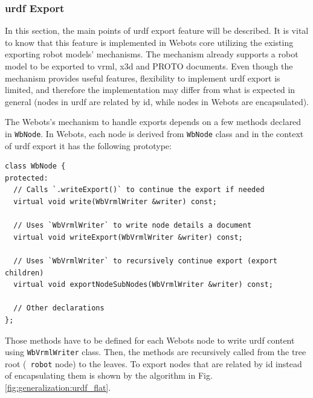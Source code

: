 \subsubsection{\ac{urdf} Export}
\label{subsub:generalization:urdf_export}

In this section, the main points of \ac{urdf} export feature will be described. It is vital to know that this feature is implemented in Webots core utilizing the existing exporting robot models' mechanisms. The mechanism already supports a robot model to be exported to \acs{vrml}, \acs{x3d} and PROTO documents. Even though the mechanism provides useful features, flexibility to implement \ac{urdf} export is limited, and therefore the implementation may differ from what is expected in general (nodes in \ac{urdf} are related by \acs{id}, while nodes in Webots are encapsulated).

The Webots's mechanism to handle exports depends on a few methods declared in \texttt{WbNode}. In Webots, each node is derived from \texttt{WbNode} class and in the context of \ac{urdf} export it has the following prototype:
\begin{verbatim}
class WbNode {
protected:
  // Calls `.writeExport()` to continue the export if needed
  virtual void write(WbVrmlWriter &writer) const;

  // Uses `WbVrmlWriter` to write node details a document
  virtual void writeExport(WbVrmlWriter &writer) const;
  
  // Uses `WbVrmlWriter` to recursively continue export (export children)
  virtual void exportNodeSubNodes(WbVrmlWriter &writer) const;
  
  // Other declarations
};
\end{verbatim}

Those methods have to be defined for each Webots node to write \ac{urdf} content using \texttt{WbVrmlWriter} class. Then, the methods are recursively called from the tree root (\texttt{ robot} node) to the leaves. To export nodes that are related by \acs{id} instead of encapsulating them is shown by the algorithm in Fig. \ref{fig:generalization:urdf_flat}.

